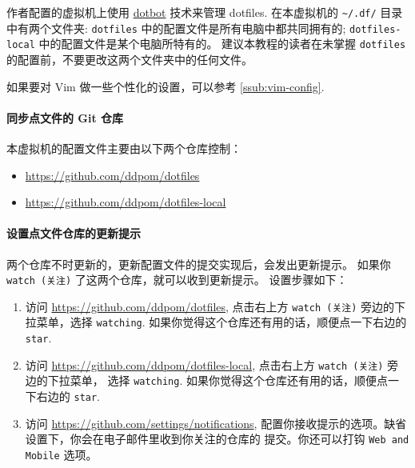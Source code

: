 \documentclass[cn,11pt, simple]{elegantbook}
\begin{document}
作者配置的虚拟机上使用
\href{https://github.com/anishathalye/dotbot}{dotbot} 技术来管理 dotfiles.
在本虚拟机的 \lstinline{~/.df/} 目录中有两个文件夹: \lstinline{dotfiles}
中的配置文件是所有电脑中都共同拥有的; \lstinline{dotfiles-local}
中的配置文件是某个电脑所特有的。
建议本教程的读者在未掌握 \lstinline{dotfiles}
的配置前，不要更改这两个文件夹中的任何文件。
\begin{note}\label{note:vim-customized}
    如果要对 Vim 做一些个性化的设置，可以参考 \ref{ssub:vim-config}.
\end{note}


\paragraph{同步点文件的 Git 仓库}%
\label{sssub:virtualbox-guest-ganx-conf}

本虚拟机的配置文件主要由以下两个仓库控制：
\begin{itemize}
    \item \href{https://github.com/ddpom/dotfiles}
        {https://github.com/ddpom/dotfiles}
    \item \href{https://github.com/ddpom/dotfiles-local}
        {https://github.com/ddpom/dotfiles-local}
\end{itemize}

\paragraph{设置点文件仓库的更新提示}%
\label{sssub:virtualbox-guest-ganx-conf-update-notification}

两个仓库不时更新的，更新配置文件的提交实现后，会发出更新提示。
如果你 \lstinline{watch (关注)} 了这两个仓库，就可以收到更新提示。
设置步骤如下：
\begin{enumerate}
    \item 访问 \href{https://github.com/ddpom/dotfiles}
        {https://github.com/ddpom/dotfiles}, 点击右上方
        \lstinline{watch (关注)} 旁边的下拉菜单，选择 \lstinline{watching}.
        如果你觉得这个仓库还有用的话，顺便点一下右边的 \lstinline{star}.
    \item 访问 \href{https://github.com/ddpom/dotfiles-local}
        {https://github.com/ddpom/dotfiles-local},
        点击右上方 \lstinline{watch (关注)} 旁边的下拉菜单，
        选择 \lstinline{watching}.
        如果你觉得这个仓库还有用的话，顺便点一下右边的 \lstinline{star}.
    \item 访问 \href{https://github.com/settings/notifications}
        {https://github.com/settings/notifications},
        配置你接收提示的选项。缺省设置下，你会在电子邮件里收到你关注的仓库的
        提交。你还可以打钩 \lstinline{Web and Mobile} 选项。
\end{enumerate}
\end{document}
